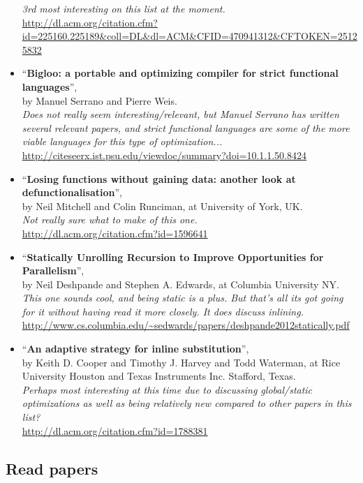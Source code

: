 \begin{itemize}
\textit{3rd most interesting on this list at the moment.} \\
\url{http://dl.acm.org/citation.cfm?id=225160.225189&coll=DL&dl=ACM&CFID=470941312&CFTOKEN=25125832}
	\item ``\textbf{Bigloo: a portable and optimizing compiler for strict
functional languages}'', \\ by Manuel Serrano and Pierre Weis. \\
\textit{Does not really seem interesting/relevant, but Manuel Serrano has
written several relevant papers, and strict functional languages are some of
the more viable languages for this type of optimization...} \\
\url{http://citeseerx.ist.psu.edu/viewdoc/summary?doi=10.1.1.50.8424}
	\item ``\textbf{Losing functions without gaining data: another look at
defunctionalisation}'', \\ by Neil Mitchell and Colin Runciman, at University of
York, UK. \\
\textit{Not really sure what to make of this one.} \\
\url{http://dl.acm.org/citation.cfm?id=1596641}
	\item ``\textbf{Statically Unrolling Recursion to Improve Opportunities for
Parallelism}'', \\by Neil Deshpande and Stephen A. Edwards, at Columbia
University NY. \\
\textit{This one sounds cool, and being static is a plus. But that's all its got going for it without having read it more closely. It does discuss
inlining.}\\
\url{http://www.cs.columbia.edu/~sedwards/papers/deshpande2012statically.pdf}
	\item ``\textbf{An adaptive strategy for inline substitution}'', \\ by Keith
D. Cooper and Timothy J. Harvey and Todd Waterman, at Rice University Houston
and Texas Instruments Inc. Stafford, Texas. \\
\textit{Perhaps most interesting at this time due to discussing global/static
optimizations as well as being relatively new compared to other papers in this
list?}\\
\url{http://dl.acm.org/citation.cfm?id=1788381}
\end{itemize}

\subsection{Read papers}

